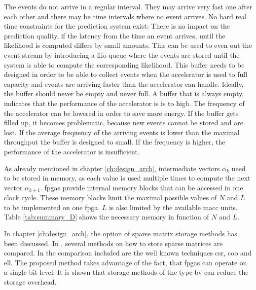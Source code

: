 \documentclass[mscthesis]{usiinfthesis}
\begin{document}
The events do not arrive in a regular interval. They may arrive very fast one
after each other and there may be time intervals where no event arrives. No
hard real time constraints for the prediction system exist: There is no impact
on the prediction quality, if the latency from the time an event arrives, until
the likelihood is computed differs by small amounts. This can be used to even
out the event stream by introducing a \gls{fifo} queue where the events are
stored until the system is able to compute the corresponding likelihood. This
buffer needs to be designed in order to be able to collect events when the
accelerator is used to full capacity and events are arriving faster than the
accelerator can handle. Ideally, the buffer should never be empty and never
full. A buffer that is always empty, indicates that the performance of the
accelerator is is to high. The frequency of the accelerator can be lowered in
order to save more energy. If the buffer gets filled up, it becomes
problematic, because new events cannot be stored and are lost. If the average
frequency of the arriving events is lower than the maximal throughput the
buffer is designed to small. If the frequency is higher, the performance of the
accelerator is insufficient.

As already mentioned in chapter \ref{ch:design_arch}, intermediate vectors
$\alpha_k$ need to be stored in memory, as each value is used multiple times to
compute the next vector $\alpha_{k+1}$. \glspl{fpga} provide internal memory
blocks that can be accessed in one clock cycle. These memory blocks limit the
maximal possible values of $N$ and $L$ to be implemented on one \gls{fpga}. $L$
is also limited by the available \gls{macc} units. Table \ref{tab:summary_D}
shows the necessary memory in function of $N$ and $L$.

In chapter \ref{ch:design_arch}, the option of sparse matrix storage methods
has been discussed. In \cite{FCCM12_Kestur}, several methods on how to store
sparse matrices are compared. In the comparison included are the well known
techniques \gls{csr}, \gls{coo} and \gls{ell}. The proposed method takes
advantage of the fact, that \glspl{fpga} can operate on a single bit level. It
is shown that storage methods of the type \gls{bv} can reduce the storage
overhead.
\end{document}
